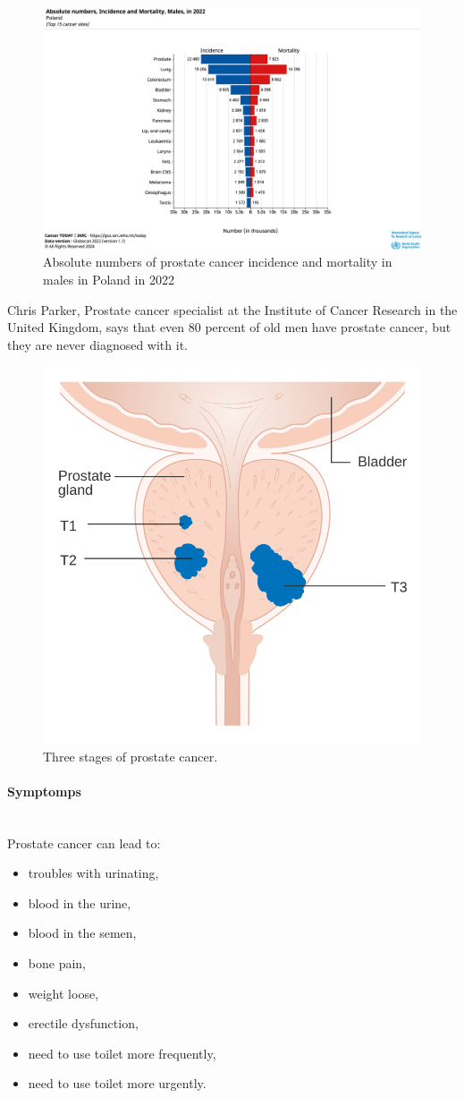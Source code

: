 \begin{figure}[H]
    \centering
    \includegraphics[width=0.5\linewidth]{background/graphic-absolute-numbers-inc-and-mort-males-in-2022-poland.png}
    \caption{Absolute numbers of prostate cancer incidence and mortality in males in Poland in 2022\cite{gco_cancer_today}}
    \label{fig:prostate-cancer-occurences}
\end{figure}

Chris Parker, Prostate cancer specialist at the Institute of Cancer Research in the United Kingdom, says that even 80 percent of old men have prostate cancer, but they are never diagnosed with it\cite{nhs_choices_2024}. 


\begin{figure}[H]
    \centering
    \includegraphics[width=0.5\linewidth]{background/Diagram_showing_T1-3_stages_of_prostate_cancer_CRUK_278.svg.png}
    \caption{Three stages of prostate cancer\cite{pc-stages}.}
    \label{fig:prostate-cancer-stages}
\end{figure}

\paragraph{Symptomps}\mbox{} \\

Prostate cancer can lead to\cite{prostate-cancer-symptomsandcauses_2024}\cite{nhs_choices_2024}:
\begin{itemize}
    \item troubles with urinating,
    \item blood in the urine,
    \item blood in the semen,
    \item bone pain,
    \item weight loose,
    \item erectile dysfunction,
    \item need to use toilet more frequently,
    \item need to use toilet more urgently.
\end{itemize}

